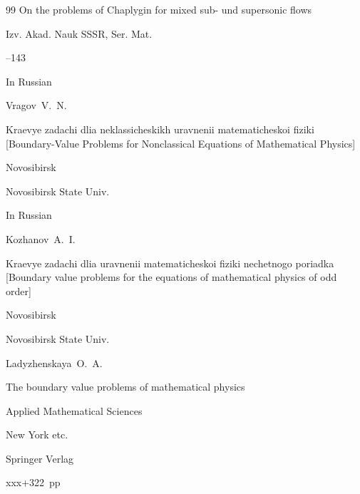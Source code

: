\begin{thebibliography}{99}
\paper On the problems of Chaplygin for mixed sub- und supersonic flows

\jour Izv. Akad. Nauk SSSR, Ser. Mat. 




--143






\lang In Russian

\by Vragov~V.~N.

\book Kraevye zadachi dlia neklassicheskikh uravnenii matematicheskoi fiziki \rm [Boundary-Value Problems for Nonclassical Equations of Mathematical Physics]

\publaddr Novosibirsk

\publ Novosibirsk State Univ.








\lang In Russian

\by Kozhanov~A.~I.

\book Kraevye zadachi dlia uravnenii matematicheskoi fiziki nechetnogo poriadka \rm [Boundary value problems for the equations of mathematical physics of odd order]

\publaddr Novosibirsk

\publ Novosibirsk State Univ.










\by Ladyzhenskaya~O.~A.

\book The boundary value problems of mathematical physics


\serial Applied Mathematical Sciences


\publaddr New York etc.

\publ Springer Verlag

\totalpages xxx+322~pp \nofrills



\end{thebibliography}
